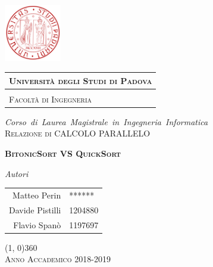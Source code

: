 \documentclass[a4paper, 10pt, twoside, openright, openany]{book}
\begin{document}
\frontmatter

\begin{titlepage} %
\begin{center}


\hspace{0.5cm}
\begin{minipage}{.20\textwidth}
  \includegraphics[height=2.5cm]{./Images/Utility/UNIPD}
\end{minipage}\begin{minipage}{.90\textwidth}
  \begin{table}[H]
  \begin{tabular}{l}
  \scshape{\Large{\bfseries{Università degli Studi di Padova}}} \\
  \hline \\
  \scshape{\Large{Facoltà di Ingegneria}} \\
  \end{tabular}
  \end{table}
\end{minipage}

\vspace{1cm}
\emph{\Large{Corso~di~Laurea~Magistrale~in~Ingegneria~Informatica}} \\
\vspace{3cm}
\scshape{\Large{Relazione di CALCOLO PARALLELO}} \\
\end{center}

\vspace{1cm}
\begin{center}
\scshape{\Large{\bfseries{BitonicSort VS QuickSort}}}
\end{center}

\vspace{3.5cm}

\begin{center}
\emph{Autori}
\vspace{0.2cm}
\begin{table}[h]
\centering
\begin{tabular}{rl}
\vspace{0.2cm}
{Matteo Perin} & {******}\\
{Davide Pistilli} & {1204880}\\
{Flavio Spanò} & {1197697}\\
\end{tabular}
\end{table}

\end{center}

\vfill
\begin{center}
\hspace{-0.2cm}
\line(1, 0){360}\\
\textsc{Anno Accademico 2018-2019}
\end{center}
\end{titlepage}
\end{document}
